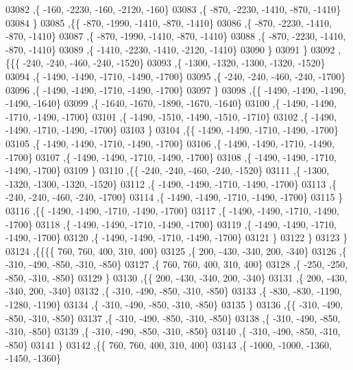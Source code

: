 \begin{DoxyCode}
03082     ,\{  -160, -2230,  -160, -2120,  -160\}
03083     ,\{  -870, -2230, -1410,  -870, -1410\}
03084     \}
03085    ,\{\{  -870, -1990, -1410,  -870, -1410\}
03086     ,\{  -870, -2230, -1410,  -870, -1410\}
03087     ,\{  -870, -1990, -1410,  -870, -1410\}
03088     ,\{  -870, -2230, -1410,  -870, -1410\}
03089     ,\{ -1410, -2230, -1410, -2120, -1410\}
03090     \}
03091    \}
03092   ,\{\{\{  -240,  -240,  -460,  -240, -1520\}
03093     ,\{ -1300, -1320, -1300, -1320, -1520\}
03094     ,\{ -1490, -1490, -1710, -1490, -1700\}
03095     ,\{  -240,  -240,  -460,  -240, -1700\}
03096     ,\{ -1490, -1490, -1710, -1490, -1700\}
03097     \}
03098    ,\{\{ -1490, -1490, -1490, -1490, -1640\}
03099     ,\{ -1640, -1670, -1890, -1670, -1640\}
03100     ,\{ -1490, -1490, -1710, -1490, -1700\}
03101     ,\{ -1490, -1510, -1490, -1510, -1710\}
03102     ,\{ -1490, -1490, -1710, -1490, -1700\}
03103     \}
03104    ,\{\{ -1490, -1490, -1710, -1490, -1700\}
03105     ,\{ -1490, -1490, -1710, -1490, -1700\}
03106     ,\{ -1490, -1490, -1710, -1490, -1700\}
03107     ,\{ -1490, -1490, -1710, -1490, -1700\}
03108     ,\{ -1490, -1490, -1710, -1490, -1700\}
03109     \}
03110    ,\{\{  -240,  -240,  -460,  -240, -1520\}
03111     ,\{ -1300, -1320, -1300, -1320, -1520\}
03112     ,\{ -1490, -1490, -1710, -1490, -1700\}
03113     ,\{  -240,  -240,  -460,  -240, -1700\}
03114     ,\{ -1490, -1490, -1710, -1490, -1700\}
03115     \}
03116    ,\{\{ -1490, -1490, -1710, -1490, -1700\}
03117     ,\{ -1490, -1490, -1710, -1490, -1700\}
03118     ,\{ -1490, -1490, -1710, -1490, -1700\}
03119     ,\{ -1490, -1490, -1710, -1490, -1700\}
03120     ,\{ -1490, -1490, -1710, -1490, -1700\}
03121     \}
03122    \}
03123   \}
03124  ,\{\{\{\{   760,   760,   400,   310,   400\}
03125     ,\{   200,  -430,  -340,   200,  -340\}
03126     ,\{  -310,  -490,  -850,  -310,  -850\}
03127     ,\{   760,   760,   400,   310,   400\}
03128     ,\{  -250,  -250,  -850,  -310,  -850\}
03129     \}
03130    ,\{\{   200,  -430,  -340,   200,  -340\}
03131     ,\{   200,  -430,  -340,   200,  -340\}
03132     ,\{  -310,  -490,  -850,  -310,  -850\}
03133     ,\{  -830,  -830, -1190, -1280, -1190\}
03134     ,\{  -310,  -490,  -850,  -310,  -850\}
03135     \}
03136    ,\{\{  -310,  -490,  -850,  -310,  -850\}
03137     ,\{  -310,  -490,  -850,  -310,  -850\}
03138     ,\{  -310,  -490,  -850,  -310,  -850\}
03139     ,\{  -310,  -490,  -850,  -310,  -850\}
03140     ,\{  -310,  -490,  -850,  -310,  -850\}
03141     \}
03142    ,\{\{   760,   760,   400,   310,   400\}
03143     ,\{ -1000, -1000, -1360, -1450, -1360\}

\end{DoxyCode}
